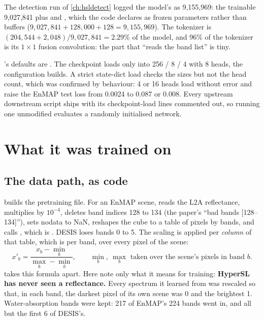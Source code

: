 The detection run of \cref{ch:hsldetect} logged the model's  as 9,155,969\tbrk{}: the trainable 9,027,841 plus
 and , which the code declares as frozen parameters rather than buffers ($9{,}027{,}841+128{,}000+
128=9{,}155{,}969$)\tagC. The tokenizer is $(204{,}544+2{,}048)/9{,}027{,}841=2.29\%$ of the model, and 96\% of the tokenizer is its $1\times1$
fusion convolution: the part that ``reads the band list'' is tiny\tagC.

\begin{sourcenote}
's defaults are . The
checkpoint loads only into 256 / 8 / 4 with 8 heads, the configuration  builds. A strict
state-dict load checks the sizes but not the head count, which was confirmed by behaviour: 4 or 16 heads load
without error and raise the EnMAP test loss from 0.0024 to 0.087 or 0.008\tbrk{}. Every upstream downstream script ships with its checkpoint-load lines commented out, so running one
unmodified evaluates a randomly initialised network.
\end{sourcenote}

\section{What it was trained on}\label{sec:hslwhat:data}

\subsection{The data path, as code}

 builds the pretraining file. For an EnMAP scene,  reads the L2A
reflectance, multiplies by $10^{-4}$, deletes band indices 128 to 134 (the paper's ``bad bands [128--134]''), sets
nodata to NaN, reshapes the cube to a table of pixels by bands, and calls , which is
. DESIS loses bands 0 to 5. The scaling is applied per \emph{column} of that
table, which is per band, over every pixel of the scene:
\begin{equation}
x'_{b}=\frac{x_b-\min_b}{\max_b-\min_b},\qquad \min_b,\ \max_b \text{ taken over the scene's pixels in band } b.
\label{eq:hslwhat:minmax}
\end{equation}
 takes this formula apart. Here note only what it means for training: \textbf{HyperSL has never seen
a reflectance.} Every spectrum it learned from was rescaled so that, in each band, the darkest pixel of its own scene
was 0 and the brightest 1. Water-absorption bands were kept: 217 of EnMAP's 224 bands went in, and all but the first 6 of DESIS's.

